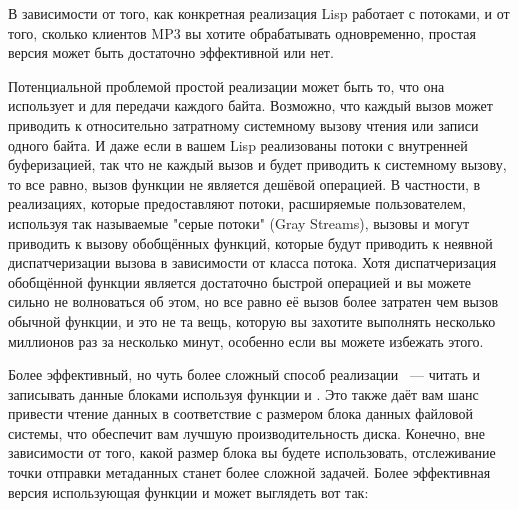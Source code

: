 В зависимости от того, как конкретная реализация Lisp работает с потоками, и от того,
сколько клиентов MP3 вы хотите обрабатывать одновременно, простая версия
 может быть достаточно эффективной или нет.

Потенциальной проблемой простой реализации может быть то, что она использует
 и  для передачи каждого байта. Возможно, что каждый
вызов может приводить к относительно затратному системному вызову чтения или записи одного
байта.  И даже если в вашем Lisp реализованы потоки с внутренней буферизацией, так что не
каждый вызов  и  будет приводить к системному вызову, то
все равно, вызов функции не является дешёвой операцией.  В частности, в реализациях,
которые предоставляют потоки, расширяемые пользователем, используя так называемые "серые
потоки" (Gray Streams), вызовы  и  могут приводить к
вызову обобщённых функций, которые будут приводить к неявной диспатчеризации вызова в
зависимости от класса потока.  Хотя диспатчеризация обобщённой функции является достаточно
быстрой операцией и вы можете сильно не волноваться об этом, но все равно её вызов более
затратен чем вызов обычной функции, и это не та вещь, которую вы захотите выполнять
несколько миллионов раз за несколько минут, особенно если вы можете избежать этого.

Более эффективный, но чуть более сложный способ реализации ~--- читать и
записывать данные блоками используя функции  и .
Это также даёт вам шанс привести чтение данных в соответствие с размером блока данных
файловой системы, что обеспечит вам лучшую производительность диска.  Конечно, вне
зависимости от того, какой размер блока вы будете использовать, отслеживание точки
отправки метаданных станет более сложной задачей.  Более эффективная версия
 использующая функции  и 
может выглядеть вот так:

